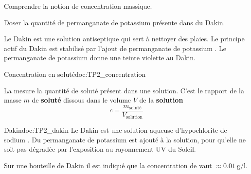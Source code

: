 \teteSndSolu


\vspace*{-36pt}


\begin{objectifs}
  \item Comprendre la notion de concentration massique.
  \item Doser la quantité de permanganate de potassium présente dans du Dakin.
\end{objectifs}


\begin{contexte}
  Le Dakin est une solution antiseptique qui sert à nettoyer des plaies. Le principe actif du Dakin est stabilisé par l'ajout de permanganate de potassium .
  Le permanganate de potassium donne une teinte violette au Dakin.
  
\end{contexte}


\begin{doc}{Concentration en soluté}{doc:TP2_concentration}
  \begin{importants}
    La  mesure la quantité de soluté présent dans une solution.
    C'est le rapport de la masse $m$ de \textbf{soluté} dissous dans le volume $V$ de la \textbf{solution}
    \begin{equation*}
      c = \frac{m_\text{soluté}}{V_\text{solution}}
    \end{equation*}
  \end{importants}
\end{doc}


\begin{doc}{Dakin}{doc:TP2_dakin}
  Le Dakin est une solution aqueuse d'hypochlorite de sodium .
  Du permanganate de potassium  est ajouté à la solution, pour qu'elle ne soit pas dégradée par l'exposition au rayonnement UV du Soleil.
  
  \fleche Sur une bouteille de Dakin il est indiqué que la concentration de  vaut $\approx \qty{0,01}{\g/\litre}$.
\end{doc}

%


